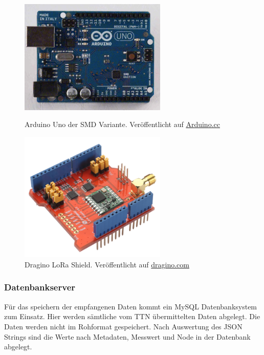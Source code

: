 \begin{figure}[H]
	\centering
	\begin{minipage}[t]{0.45\linewidth}
		\includegraphics[width=7cm]{figures/ArduinoUnoSMDFront.jpg}
		\caption{Arduino Uno der SMD Variante. Veröffentlicht auf \href{https://www.arduino.cc/en/Main/ArduinoBoardUnoSMD}{Arduino.cc}}
		\label{fig:ardoinoUno}
	\end{minipage}
	\hfill
	\begin{minipage}[t]{0.45\linewidth}
		\includegraphics[width=7cm]{figures/LoraShield-1.png}
		\caption{Dragino LoRa Shield. Veröffentlicht auf \href{http://www.dragino.com/products/lora/item/102-lora-shield.html}{dragino.com}}
		\label{fig:draginoShield}
	\end{minipage}
\end{figure}

\subsubsection{Datenbankserver}
Für das speichern der empfangenen Daten kommt ein MySQL Datenbanksystem zum Einsatz. Hier werden sämtliche vom TTN übermittelten Daten abgelegt. Die Daten werden nicht im Rohformat gespeichert. Nach Auswertung des JSON Strings sind die Werte nach Metadaten, Messwert und Node in der Datenbank abgelegt.

